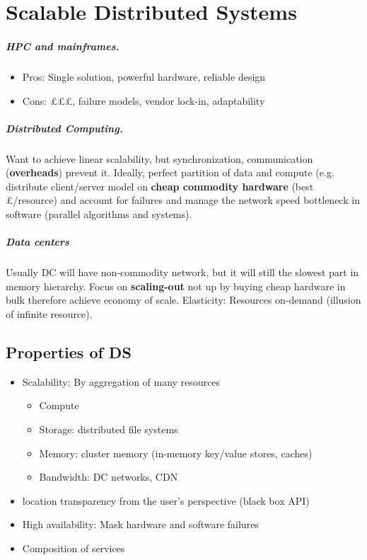 \chapter{Scalable Distributed Systems}

\paragraph{
HPC and mainframes.
}
\begin{itemize}
\item Pros: Single solution, powerful hardware, reliable design
\item Cons: £££, failure models, vendor lock-in, adaptability
\end{itemize}

\paragraph{Distributed Computing.} Want to achieve linear scalability, but
synchronization, communication (\textbf{overheads}) prevent it. Ideally, perfect
partition of data and compute (e.g. distribute client/server model on
\textbf{cheap commodity hardware} (best £/resource) and account for failures and
manage the network speed bottleneck in software (parallel algorithms and
systems).

\paragraph{Data centers} Usually DC will have non-commodity network, but it will
still the slowest part in memory hierarchy. Focus on \textbf{scaling-out} not up
by buying cheap hardware in bulk therefore achieve economy of scale. Elasticity:
Resources on-demand (illusion of infinite resource).

\section{Properties of DS}
\begin{itemize}
\item Scalability: By aggregation of many resources
  \begin{itemize}
  \item Compute
  \item Storage: distributed file systems
  \item Memory: cluster memory (in-memory key/value stores, caches)
  \item Bandwidth: DC networks, CDN
  \end{itemize}
  \item location transparency from the user's perspective (black box API)
  \item High availability: Mask hardware and software failures
  \item Composition of services
\end{itemize}

